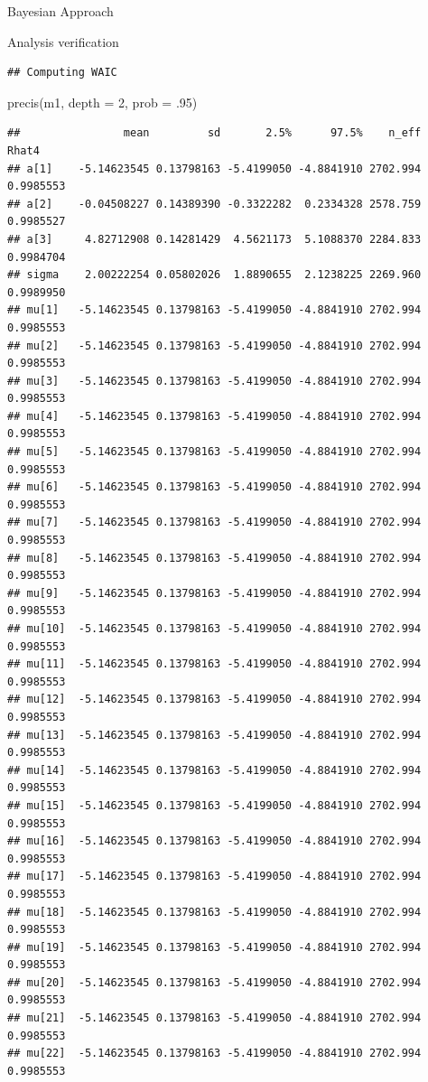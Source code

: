 \documentclass[
  ignorenonframetext,
]{beamer}
\newenvironment{Shaded}{\begin{snugshade}}{\end{snugshade}}
\newcommand{\AttributeTok}[1]{\textcolor[rgb]{0.77,0.63,0.00}{#1}}
\newcommand{\DecValTok}[1]{\textcolor[rgb]{0.00,0.00,0.81}{#1}}
\newcommand{\FunctionTok}[1]{\textcolor[rgb]{0.00,0.00,0.00}{#1}}
\newcommand{\NormalTok}[1]{#1}
\begin{document}
\begin{frame}[fragile]{Bayesian Approach}
\begin{block}{Analysis verification}
\begin{verbatim}
## Computing WAIC
\end{verbatim}

\begin{Shaded}
\begin{Highlighting}[]
\FunctionTok{precis}\NormalTok{(m1, }\AttributeTok{depth =} \DecValTok{2}\NormalTok{, }\AttributeTok{prob =}\NormalTok{ .}\DecValTok{95}\NormalTok{)}
\end{Highlighting}
\end{Shaded}

\begin{verbatim}
##                mean         sd       2.5%      97.5%    n_eff     Rhat4
## a[1]    -5.14623545 0.13798163 -5.4199050 -4.8841910 2702.994 0.9985553
## a[2]    -0.04508227 0.14389390 -0.3322282  0.2334328 2578.759 0.9985527
## a[3]     4.82712908 0.14281429  4.5621173  5.1088370 2284.833 0.9984704
## sigma    2.00222254 0.05802026  1.8890655  2.1238225 2269.960 0.9989950
## mu[1]   -5.14623545 0.13798163 -5.4199050 -4.8841910 2702.994 0.9985553
## mu[2]   -5.14623545 0.13798163 -5.4199050 -4.8841910 2702.994 0.9985553
## mu[3]   -5.14623545 0.13798163 -5.4199050 -4.8841910 2702.994 0.9985553
## mu[4]   -5.14623545 0.13798163 -5.4199050 -4.8841910 2702.994 0.9985553
## mu[5]   -5.14623545 0.13798163 -5.4199050 -4.8841910 2702.994 0.9985553
## mu[6]   -5.14623545 0.13798163 -5.4199050 -4.8841910 2702.994 0.9985553
## mu[7]   -5.14623545 0.13798163 -5.4199050 -4.8841910 2702.994 0.9985553
## mu[8]   -5.14623545 0.13798163 -5.4199050 -4.8841910 2702.994 0.9985553
## mu[9]   -5.14623545 0.13798163 -5.4199050 -4.8841910 2702.994 0.9985553
## mu[10]  -5.14623545 0.13798163 -5.4199050 -4.8841910 2702.994 0.9985553
## mu[11]  -5.14623545 0.13798163 -5.4199050 -4.8841910 2702.994 0.9985553
## mu[12]  -5.14623545 0.13798163 -5.4199050 -4.8841910 2702.994 0.9985553
## mu[13]  -5.14623545 0.13798163 -5.4199050 -4.8841910 2702.994 0.9985553
## mu[14]  -5.14623545 0.13798163 -5.4199050 -4.8841910 2702.994 0.9985553
## mu[15]  -5.14623545 0.13798163 -5.4199050 -4.8841910 2702.994 0.9985553
## mu[16]  -5.14623545 0.13798163 -5.4199050 -4.8841910 2702.994 0.9985553
## mu[17]  -5.14623545 0.13798163 -5.4199050 -4.8841910 2702.994 0.9985553
## mu[18]  -5.14623545 0.13798163 -5.4199050 -4.8841910 2702.994 0.9985553
## mu[19]  -5.14623545 0.13798163 -5.4199050 -4.8841910 2702.994 0.9985553
## mu[20]  -5.14623545 0.13798163 -5.4199050 -4.8841910 2702.994 0.9985553
## mu[21]  -5.14623545 0.13798163 -5.4199050 -4.8841910 2702.994 0.9985553
## mu[22]  -5.14623545 0.13798163 -5.4199050 -4.8841910 2702.994 0.9985553

\end{verbatim}
\end{block}
\end{frame}
\end{document}
